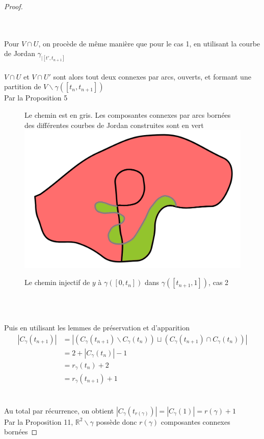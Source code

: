 \documentclass{article}
\begin{document}
\begin{flushleft}
\begin{proof}
\begin{itemize}
        \\~\\
        Pour $V \cap U$, on procède de même manière que pour le cas 1, en utilisant la courbe de Jordan $\gamma_{\mid [t', t_{n+1}]}$
        \\~\\
        $V \cap U$ et $V \cap U'$ sont alors tout deux connexes par arcs, ouverts, et formant une partition de $V \backslash \gamma([t_n, t_{n+1}])$\\
        Par la Proposition 5
        \begin{figure}[h]
            \caption{Le chemin injectif de $y$ à $\gamma([0, t_n])$ dans $\gamma([t_{n+1}, 1])$, cas 2}
            \centering
            Le chemin est en gris.
            Les composantes connexes par arcs bornées des différentes courbes de Jordan construites sont en vert\\
            \includegraphics*[width = 0.5 \textwidth]{Unicité cas 2.png}
        \end{figure}
        \\~\\
    \end{itemize}
    Puis en utilisant les lemmes de préservation et d'apparition
    \begin{align*}
        |C_{\gamma}(t_{n+1})| &= |(C_{\gamma}(t_{n+1}) \backslash C_{\gamma}(t_n)) \sqcup (C_{\gamma}(t_{n+1}) \cap C_{\gamma}(t_n)) |\\
        &= 2 + |C_{\gamma}(t_n)| - 1\\
        &= r_{\gamma}(t_n) + 2\\
        &= r_{\gamma}(t_{n+1}) + 1
    \end{align*}
    \\~\\
    Au total par récurrence, on obtient $|C_{\gamma}(t_{r(\gamma)})| = |C_{\gamma}(1)| = r(\gamma) + 1$\\
    Par la Proposition 11, $\mathbb{R}^2 \backslash \gamma$ possède donc $r(\gamma)$ composantes connexes bornées

\end{proof}

\end{flushleft}
\end{document}
